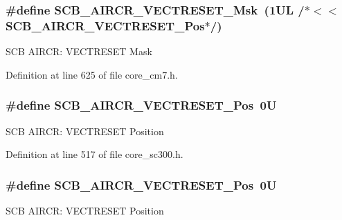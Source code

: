 \subsubsection[{\texorpdfstring{S\+C\+B\+\_\+\+A\+I\+R\+C\+R\+\_\+\+V\+E\+C\+T\+R\+E\+S\+E\+T\+\_\+\+Msk}{SCB_AIRCR_VECTRESET_Msk}}]{\setlength{\rightskip}{0pt plus 5cm}\#define S\+C\+B\+\_\+\+A\+I\+R\+C\+R\+\_\+\+V\+E\+C\+T\+R\+E\+S\+E\+T\+\_\+\+Msk~(1\+U\+L /$\ast$$<$$<$ S\+C\+B\+\_\+\+A\+I\+R\+C\+R\+\_\+\+V\+E\+C\+T\+R\+E\+S\+E\+T\+\_\+\+Pos$\ast$/)}\hypertarget{group___c_m_s_i_s___s_c_b_ga3006e31968bb9725e7b4ee0784d99f7f}{}\label{group___c_m_s_i_s___s_c_b_ga3006e31968bb9725e7b4ee0784d99f7f}
S\+CB A\+I\+R\+CR\+: V\+E\+C\+T\+R\+E\+S\+ET Mask 

Definition at line 625 of file core\+\_\+cm7.\+h.

\subsubsection[{\texorpdfstring{S\+C\+B\+\_\+\+A\+I\+R\+C\+R\+\_\+\+V\+E\+C\+T\+R\+E\+S\+E\+T\+\_\+\+Pos}{SCB_AIRCR_VECTRESET_Pos}}]{\setlength{\rightskip}{0pt plus 5cm}\#define S\+C\+B\+\_\+\+A\+I\+R\+C\+R\+\_\+\+V\+E\+C\+T\+R\+E\+S\+E\+T\+\_\+\+Pos~0U}\hypertarget{group___c_m_s_i_s___s_c_b_ga0d483d9569cd9d1b46ec0d171b1f18d8}{}\label{group___c_m_s_i_s___s_c_b_ga0d483d9569cd9d1b46ec0d171b1f18d8}
S\+CB A\+I\+R\+CR\+: V\+E\+C\+T\+R\+E\+S\+ET Position 

Definition at line 517 of file core\+\_\+sc300.\+h.

\subsubsection[{\texorpdfstring{S\+C\+B\+\_\+\+A\+I\+R\+C\+R\+\_\+\+V\+E\+C\+T\+R\+E\+S\+E\+T\+\_\+\+Pos}{SCB_AIRCR_VECTRESET_Pos}}]{\setlength{\rightskip}{0pt plus 5cm}\#define S\+C\+B\+\_\+\+A\+I\+R\+C\+R\+\_\+\+V\+E\+C\+T\+R\+E\+S\+E\+T\+\_\+\+Pos~0U}\hypertarget{group___c_m_s_i_s___s_c_b_ga0d483d9569cd9d1b46ec0d171b1f18d8}{}\label{group___c_m_s_i_s___s_c_b_ga0d483d9569cd9d1b46ec0d171b1f18d8}
S\+CB A\+I\+R\+CR\+: V\+E\+C\+T\+R\+E\+S\+ET Position 

